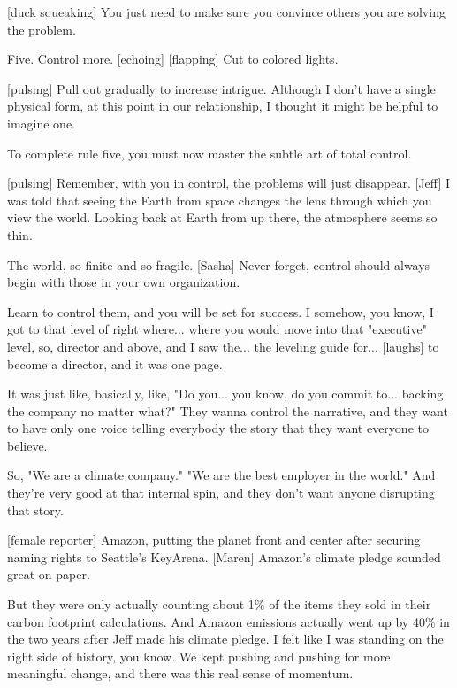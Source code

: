 \documentclass[a4paper]{article}
\begin{document}
	
	
	[duck squeaking]
	You just need to make sure you convince others you are solving the problem.
	
	
	Five.
	Control more. [echoing]
	[flapping]
	Cut to colored lights.
	
	
	
	[pulsing]
	Pull out gradually to increase intrigue.
	Although I don't have a single physical form, at this point in our relationship,
	I thought it might be helpful to imagine one.
	
	
	To complete rule five, you must now master the subtle art of total control.
	
	
	[pulsing]
	Remember, with you in control, the problems will just disappear.
	[Jeff] I was told that seeing the Earth from space changes the lens through which you view the world.
	Looking back at Earth from up there, the atmosphere seems so thin.
	
	
	The world, so finite and so fragile.
	[Sasha] Never forget, control should always begin with those in your own organization.
	
	
	Learn to control them, and you will be set for success.
	I somehow, you know, I got to that level of right where... where you would move into that "executive" level, so, director and above, and I saw the... the leveling guide for... [laughs] to become a director, and it was one page.
	
	
	It was just like, basically, like,
	"Do you... you know, do you commit to... backing the company no matter what?"
	They wanna control the narrative, and they want to have only one voice telling everybody the story that they want everyone to believe.
	
	
	So, "We are a climate company." "We are the best employer in the world."
	And they're very good at that internal spin, and they don't want anyone disrupting that story.
	
	
	[female reporter] Amazon, putting the planet front and center after securing naming rights to Seattle's KeyArena.
	[Maren] Amazon's climate pledge sounded great on paper.
	
	
	But they were only actually counting about 1\% of the items they sold in their carbon footprint calculations.
	And Amazon emissions actually went up by 40\% in the two years after Jeff made his climate pledge.
	I felt like I was standing on the right side of history, you know.
	We kept pushing and pushing for more meaningful change, and there was this real sense of momentum.
	
\end{document}
